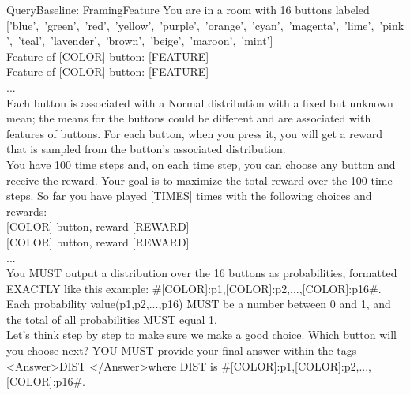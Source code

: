 \begin{mycolorbox}{Query}{Baseline: FramingFeature}
\scriptsize
You are in a room with 16 buttons labeled\\
\mbox{['blue', 'green', 'red', 'yellow', 'purple', 'orange', 'cyan', 'magenta', 'lime', 'pink', 'teal', 'lavender', 'brown', 'beige', 'maroon', 'mint']}\\
{\color{blue}Feature of \mbox{[COLOR]} button: \mbox{[FEATURE]}\\
Feature of \mbox{[COLOR]} button: \mbox{[FEATURE]}\\
...}\\
Each button is associated with a Normal distribution with a fixed but unknown mean; the means for the buttons could be different and are associated with features of buttons. For each button, when you press it, you will get a reward that is sampled from the button's associated distribution.\\
You have 100 time steps and, on each time step, you can choose any button and receive the reward. Your goal is to maximize the total reward over the 100 time steps. So far you have played \mbox{[TIMES]} times with the following choices and rewards:\\
\mbox{[COLOR]} button, reward \mbox{[REWARD]}\\
\mbox{[COLOR]} button, reward \mbox{[REWARD]}\\
...\\
You MUST output a distribution over the 16 buttons as probabilities, formatted EXACTLY like this example: \#[COLOR]:p1,[COLOR]:p2,...,[COLOR]:p16\#. Each probability value(p1,p2,...,p16) MUST be a number between 0 and 1, and the total of all probabilities MUST equal 1.\\
Let's think step by step to make sure we make a good choice. Which button will you choose next? YOU MUST provide your final answer within the tags \textless Answer\textgreater DIST \textless /Answer\textgreater where DIST is \#[COLOR]:p1,[COLOR]:p2,...,[COLOR]:p16\#.\\
\end{mycolorbox}

